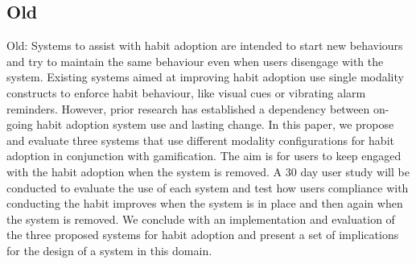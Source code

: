 \subsection*{Old}
Old: Systems to assist with habit adoption are intended to start new behaviours and try to maintain the same behaviour even when users disengage with the system. Existing systems aimed at improving habit adoption use single modality constructs to enforce habit behaviour, like visual cues or vibrating alarm reminders. However, prior research has established a dependency between on-going habit adoption system use and lasting change. In this paper, we propose and evaluate three systems that use different modality configurations for habit adoption in conjunction with gamification. The aim is for users to keep engaged with the habit adoption when the system is removed. A 30 day user study will be conducted to evaluate the use of each system and test how users compliance with conducting the habit improves when the system is in place and then again when the system is removed. We conclude with an implementation and evaluation of the three proposed systems for habit adoption and present a set of implications for the design of a system in this domain.

